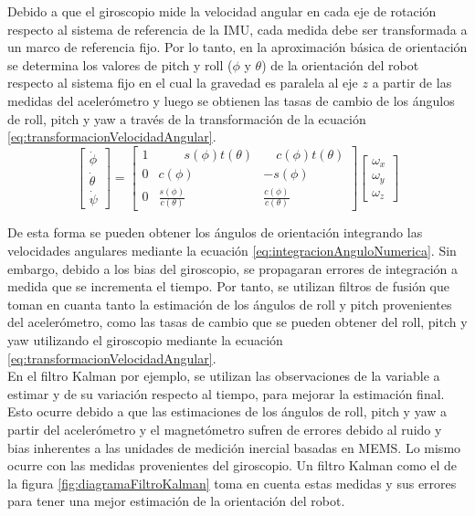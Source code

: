 Debido a que el giroscopio mide la velocidad angular en cada eje de rotación respecto al sistema de referencia de la IMU, cada medida debe ser transformada a un marco de referencia fijo. Por lo tanto, en la aproximación básica de orientación se determina los valores de pitch y roll ($\phi$ y $\theta$) de la orientación del robot respecto al sistema fijo en el cual la gravedad es paralela al eje $z$ a partir de las medidas del acelerómetro y luego se obtienen las tasas de cambio de los ángulos de roll, pitch y yaw a través de la transformación de la ecuación \ref{eq:transformacionVelocidadAngular}.\\

\begin{equation}
\left[ \begin{matrix} \dot { \phi  }  \\ \dot { \theta  }  \\ \dot { \psi  }  \end{matrix} \right] =\left[ \begin{matrix} 1 & \quad \quad s(\phi )t(\theta ) & \quad c(\phi )t(\theta ) \\ 0 & c(\phi ) & -s(\phi ) \\ 0 & \frac { s(\phi ) }{ c(\theta ) }  & \frac { c(\phi ) }{ c(\theta ) }  \end{matrix} \right] \left[ \begin{matrix} { \omega  }_{ x } \\ { \omega  }_{ y } \\ { \omega  }_{ z } \end{matrix} \right] 
\label{eq:transformacionVelocidadAngular} 
\end{equation}

De esta forma se pueden obtener los ángulos de orientación integrando las velocidades angulares mediante la ecuación \ref{eq:integracionAnguloNumerica}. Sin embargo, debido a los bias del giroscopio, se propagaran errores de integración a medida que se incrementa el tiempo. Por tanto, se utilizan filtros de fusión que toman en cuanta tanto la estimación de los ángulos de roll y pitch provenientes del acelerómetro, como las tasas de cambio que se pueden obtener del roll, pitch y yaw  utilizando el giroscopio mediante la ecuación \ref{eq:transformacionVelocidadAngular}.\\

En el filtro Kalman por ejemplo, se utilizan
las observaciones de la variable a estimar y de su variación respecto al tiempo, para mejorar la estimación final. Esto ocurre debido a que las estimaciones de los ángulos de roll, pitch y yaw a partir del acelerómetro y el magnetómetro sufren de errores debido al ruido y bias inherentes a las unidades de medición inercial basadas en MEMS. Lo mismo ocurre con las medidas provenientes del giroscopio. Un filtro Kalman como el de la figura  \ref{fig:diagramaFiltroKalman} toma en cuenta estas medidas y sus errores para tener una mejor estimación de la orientación del robot.\\

